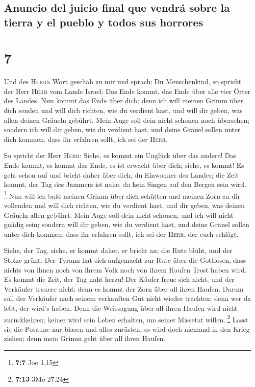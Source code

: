 \hypertarget{anuncio-del-juicio-final-que-vendruxe1-sobre-la-tierra-y-el-pueblo-y-todos-sus-horrores}{%
\subsection{Anuncio del juicio final que vendrá sobre la tierra y el
pueblo y todos sus
horrores}\label{anuncio-del-juicio-final-que-vendruxe1-sobre-la-tierra-y-el-pueblo-y-todos-sus-horrores}}

\hypertarget{section-6}{%
\section{7}\label{section-6}}

 Und des \textsc{Herrn} Wort geschah zu mir und sprach:
 Du Menschenkind, so spricht der Herr \textsc{Herr} vom
Lande Israel: Das Ende kommt, das Ende über alle vier Örter des Landes.
 Nun kommt das Ende über dich; denn ich will meinen Grimm
über dich senden und will dich richten, wie du verdient hast, und will
dir geben, was allen deinen Gräueln gebührt.  Mein Auge
soll dein nicht schonen noch übersehen; sondern ich will dir geben, wie
du verdient hast, und deine Gräuel sollen unter dich kommen, dass ihr
erfahren sollt, ich sei der \textsc{Herr}.

 So spricht der Herr \textsc{Herr}: Siehe, es kommt ein
Unglück über das andere!  Das Ende kommt, es kommt das
Ende, es ist erwacht über dich; siehe, es kommt!  Es geht
schon auf und bricht daher über dich, du Einwohner des Landes; die Zeit
kommt, der Tag des Jammers ist nahe, da kein Singen auf den Bergen sein
wird. \footnote{\textbf{7:7} Joe 1,15}  Nun will ich bald
meinen Grimm über dich schütten und meinen Zorn an dir vollenden und
will dich richten, wie du verdient hast, und dir geben, was deinen
Gräueln allen gebührt.  Mein Auge soll dein nicht schonen,
und ich will nicht gnädig sein; sondern will dir geben, wie du verdient
hast, und deine Gräuel sollen unter dich kommen, dass ihr erfahren
sollt, ich sei der \textsc{Herr}, der euch schlägt.

 Siehe, der Tag, siehe, er kommt daher, er bricht an; die
Rute blüht, und der Stolze grünt.  Der Tyrann hat sich
aufgemacht zur Rute über die Gottlosen, dass nichts von ihnen noch von
ihrem Volk noch von ihrem Haufen Trost haben wird.  Es
kommt die Zeit, der Tag naht herzu! Der Käufer freue sich nicht, und der
Verkäufer trauere nicht; denn es kommt der Zorn über all ihren Haufen.
 Darum soll der Verkäufer nach seinem verkauften Gut
nicht wieder trachten; denn wer da lebt, der wird's haben. Denn die
Weissagung über all ihren Haufen wird nicht zurückkehren; keiner wird
sein Leben erhalten, um seiner Missetat willen. \footnote{\textbf{7:13}
  3Mo 27,24}  Lasst sie die Posaune nur blasen und alles
zurüsten, es wird doch niemand in den Krieg ziehen; denn mein Grimm geht
über all ihren Haufen.

